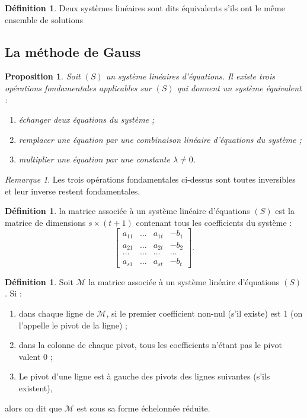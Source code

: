 \documentclass{article}
\newtheorem{prp}[thm]{Proposition}
\theoremstyle{definition}
\newtheorem{déf}[thm]{Définition}
\theoremstyle{remark}
\newtheorem*{rmq}{Remarque}
\begin{document}
		\begin{déf} Deux systèmes linéaires sont dits équivalents s'ils ont le même ensemble de solutions \end{déf}

	\subsection{La méthode de Gauss}
		\begin{prp}\label{opérationsFondamentalesGauss}
		Soit $(S)$ un système linéaires d'équations. Il existe trois opérations fondamentales applicables sur $(S)$ qui donnent un système équivalent :
		\begin{enumerate}
			\item échanger deux équations du système ;
			\item remplacer une équation par une combinaison linéaire d'équations du système ;
			\item multiplier une équation par une constante $\lambda \neq 0$.
		\end{enumerate}
		\end{prp}

		\begin{rmq} Les trois opérations fondamentales ci-dessus sont toutes inversibles et leur inverse restent fondamentales. \end{rmq}

		\begin{déf} la matrice associée à un système linéaire d'équations $(S)$ est la matrice de dimensions $s \times (t+1)$ contenant tous les coefficients du système :
		\[\begin{bmatrix}a_{11} & \ldots & a_{1t} & -b_1 \\
		                 a_{21} & \ldots & a_{2t} & -b_2 \\
										 \ldots & \ldots & \ldots & \ldots \\
										 a_{s1} & \ldots & a_{st} & -b_t
			\end{bmatrix}.\]
		\end{déf}

		\begin{déf} Soit $\mathcal M$ la matrice associée à un système linéaire d'équations $(S)$. Si :
		\begin{enumerate}
			\item dans chaque ligne de $\mathcal M$, si le premier coefficient non-nul (s'il existe) est 1 (on l'appelle le pivot de la ligne) ;
			\item dans la colonne de chaque pivot, tous les coefficients n'étant pas le pivot valent 0 ;
			\item Le pivot d'une ligne est à gauche des pivots des lignes suivantes (s'ils existent),
		\end{enumerate}
		alors on dit que $\mathcal M$ est sous sa forme échelonnée réduite.
		\end{déf}
\end{document}
